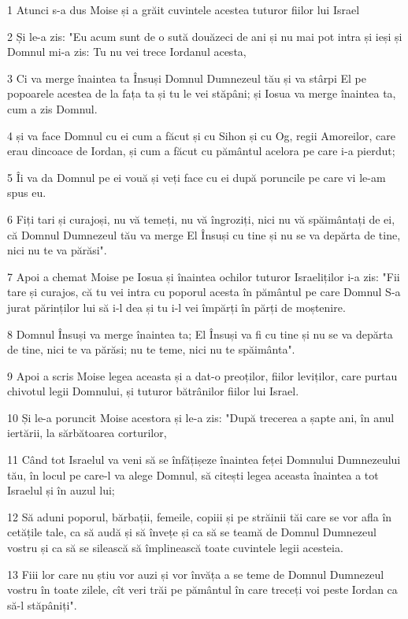 \par 1 Atunci s-a dus Moise și a grăit cuvintele acestea tuturor fiilor lui Israel
\par 2 Și le-a zis: "Eu acum sunt de o sută douăzeci de ani și nu mai pot intra și ieși și Domnul mi-a zis: Tu nu vei trece Iordanul acesta,
\par 3 Ci va merge înaintea ta Însuși Domnul Dumnezeul tău și va stârpi El pe popoarele acestea de la fața ta și tu le vei stăpâni; și Iosua va merge înaintea ta, cum a zis Domnul.
\par 4 și va face Domnul cu ei cum a făcut și cu Sihon și cu Og, regii Amoreilor, care erau dincoace de Iordan, și cum a făcut cu pământul acelora pe care i-a pierdut;
\par 5 Îi va da Domnul pe ei vouă și veți face cu ei după poruncile pe care vi le-am spus eu.
\par 6 Fiți tari și curajoși, nu vă temeți, nu vă îngroziți, nici nu vă spăimântați de ei, că Domnul Dumnezeul tău va merge El Însuși cu tine și nu se va depărta de tine, nici nu te va părăsi".
\par 7 Apoi a chemat Moise pe Iosua și înaintea ochilor tuturor Israeliților i-a zis: "Fii tare și curajos, că tu vei intra cu poporul acesta în pământul pe care Domnul S-a jurat părinților lui să i-l dea și tu i-l vei împărți în părți de moștenire.
\par 8 Domnul Însuși va merge înaintea ta; El Însuși va fi cu tine și nu se va depărta de tine, nici te va părăsi; nu te teme, nici nu te spăimânta".
\par 9 Apoi a scris Moise legea aceasta și a dat-o preoților, fiilor leviților, care purtau chivotul legii Domnului, și tuturor bătrânilor fiilor lui Israel.
\par 10 Și le-a poruncit Moise acestora și le-a zis: "După trecerea a șapte ani, în anul iertării, la sărbătoarea corturilor,
\par 11 Când tot Israelul va veni să se înfățișeze înaintea feței Domnului Dumnezeului tău, în locul pe care-l va alege Domnul, să citești legea aceasta înaintea a tot Israelul și în auzul lui;
\par 12 Să aduni poporul, bărbații, femeile, copiii și pe străinii tăi care se vor afla în cetățile tale, ca să audă și să învețe și ca să se teamă de Domnul Dumnezeul vostru și ca să se silească să împlinească toate cuvintele legii acesteia.
\par 13 Fiii lor care nu știu vor auzi și vor învăța a se teme de Domnul Dumnezeul vostru în toate zilele, cît veri trăi pe pământul în care treceți voi peste Iordan ca să-l stăpâniți".
